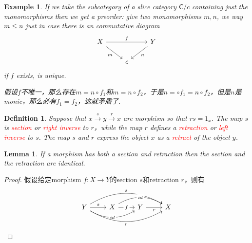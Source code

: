 \documentclass{article}
\newtheorem{lemma}[theorem]{Lemma}
\newtheorem{example}[theorem]{Example}
\newtheorem{definition}[theorem]{Definition}
\newcommand*{\cat}[1]{\textsf{#1}\xspace}
\newcommand{\id}{1}
\newcommand{\redt}[1]{\textcolor{red}{#1}}
\begin{document}
\begin{example}
\rm If we take the subcategory of a slice category $\cat{C}/c$ containing just the monomorphisms then we get a preorder: give two monomorphisms $m,n$, we way $m \leq n$ just in case there is an commutative diagram
$$
\begin{tikzcd}
X \arrow[rd, "m"'] \arrow[rr, "f"] &   & Y \arrow[ld, "n"] \\
                                   & c &                  
\end{tikzcd}
$$
if $f$ exists, is unique. 

假设$f$不唯一，那么存在$m = n \circ f_1$和$m = n \circ f_2$，于是$n = \circ f_1 = n \circ f_2$，但是$n$是monic，那么必有$f_1 = f_2$，这就矛盾了. 
\end{example}

\begin{definition}
\rm Suppose that $x \xrightarrow{s} y \xrightarrow{r} x$ are morphism so that $rs = \id_x$. The map $s$ is \redt{section} or \redt{right inverse} to $r$，while the map $r$ defines a \redt{retraction} or \redt{left inverse} to $s$. The map $s$ and $r$ express the object $x$ as a \redt{retract} of the object $y$.
\end{definition}

\begin{lemma}
\rm If a morphism has both a section and retraction then the section and the retraction are identical.
\end{lemma}

\begin{proof}
\rm 假设给定morphism $f:X \to Y$的section $s$和retraction $r$，则有
$$
\begin{tikzcd}
Y \arrow[r, "s"] \arrow[rr, "id" description, bend right] \arrow[rrr, "s", bend left] \arrow[rrr, "r"', bend right] & X \arrow[r, "f" description] \arrow[rr, "id" description, bend left] & Y \arrow[r, "r"'] & X
\end{tikzcd}
$$ 
\end{proof}
\end{document}
